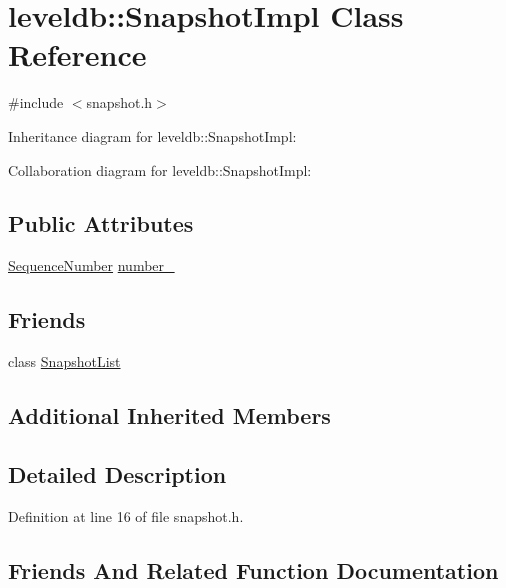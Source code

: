 \hypertarget{classleveldb_1_1_snapshot_impl}{}\section{leveldb\+:\+:Snapshot\+Impl Class Reference}
\label{classleveldb_1_1_snapshot_impl}


{\ttfamily \#include $<$snapshot.\+h$>$}



Inheritance diagram for leveldb\+:\+:Snapshot\+Impl\+:


Collaboration diagram for leveldb\+:\+:Snapshot\+Impl\+:
\subsection*{Public Attributes}
\begin{DoxyCompactItemize}
\item 
\hyperlink{namespaceleveldb_a5481ededd221c36d652c371249f869fa}{Sequence\+Number} \hyperlink{classleveldb_1_1_snapshot_impl_aa31dca969679d05d17c4c0eb1443a96e}{number\+\_\+}
\end{DoxyCompactItemize}
\subsection*{Friends}
\begin{DoxyCompactItemize}
\item 
class \hyperlink{classleveldb_1_1_snapshot_impl_abe14b2fb5e32159324c619e1a42327a0}{Snapshot\+List}
\end{DoxyCompactItemize}
\subsection*{Additional Inherited Members}


\subsection{Detailed Description}


Definition at line 16 of file snapshot.\+h.



\subsection{Friends And Related Function Documentation}
\hypertarget{classleveldb_1_1_snapshot_impl_abe14b2fb5e32159324c619e1a42327a0}{}
